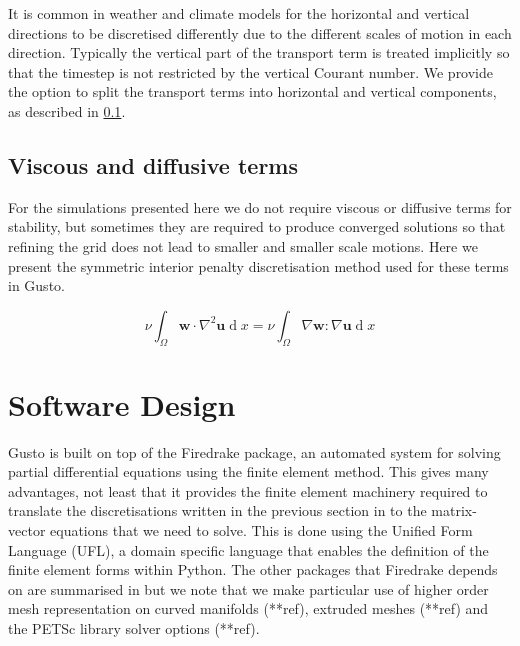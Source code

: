 \documentclass[journal abbreviation, manuscript]{copernicus}
\def\MM#1{\boldsymbol{#1}}
\DeclareMathOperator{\diff}{d}
\begin{document}
It is common in weather and climate models for the horizontal and
vertical directions to be discretised differently due to the different
scales of motion in each direction. Typically the vertical part of the
transport term is treated implicitly so that the timestep is not
restricted by the vertical Courant number. We provide the option to
split the transport terms into horizontal and vertical components, as
described in \ref{}.

\subsection{Viscous and diffusive terms}

For the simulations presented here we do not require viscous or
diffusive terms for stability, but sometimes they are required to
produce converged solutions so that refining the grid does not
lead to smaller and smaller scale motions. Here we present the symmetric
interior penalty discretisation method used for these terms in Gusto.

\begin{equation}
  \nu\int_\Omega\MM{w}\cdot\nabla^2\MM{u}\diff x = \nu\int_\Omega\nabla\MM{w}:\nabla\MM{u}\diff x
\end{equation}

\section{Software Design}
\label{sec: design}
Gusto is built on top of the Firedrake package, an automated system
for solving partial differential equations using the finite element
method. This gives many advantages, not least that it provides the
finite element machinery required to translate the discretisations
written in the previous section in to the matrix-vector equations that
we need to solve. This is done using the Unified Form Language (UFL),
a domain specific language that enables the definition of the finite
element forms within Python. The other packages that Firedrake depends
on are summarised in \citet{davies2022towards} but we note that we
make particular use of higher order mesh representation on curved
manifolds (**ref), extruded meshes (**ref) and the PETSc library
solver options (**ref).

\begin{figure}
\end{figure}
\end{document}
